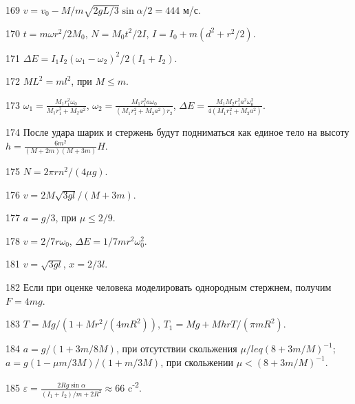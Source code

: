 \begin{Answer}{169}
$v = v_0 -M/m \sqrt{2gL/3} \sin \alpha /2 = 444$ м/с.
\end{Answer}
\begin{Answer}{170}
$t = m\omega r^2 / 2M_0$, $N = M_0t^2/2I$, $I = I_0 + m(d^2 + r^2/2)$.
\end{Answer}
\begin{Answer}{171}
$\Delta E = I_1 I_2 (\omega_1 - \omega_2)^2/ 2(I_1 + I_2)$.
\end{Answer}
\begin{Answer}{172}
$ML^2 = ml^2$, при $M \leq m$.
\end{Answer}
\begin{Answer}{173}
$\omega_1 = \frac{M_1r_1^2\omega_0}{M_1r_1^2 + M_2a^2}$, $\omega_2 = \frac{M_1r_1^2 a \omega_0}{(M_1r_1^2 + M_2a^2)r_2}$, $\Delta E = \frac{M_1 M_2r_1^2a^2\omega_0^2}{4(M_1r_1^2 + M_2a^2)}$.
\end{Answer}
\begin{Answer}{174}
После удара шарик и стержень будут подниматься как единое тело на высоту $h = \frac{6m^2}{(M+2m)(M+3m)}H$.
\end{Answer}
\begin{Answer}{175}
$N = 2\pi r n^2/(4 \mu g)$.
\end{Answer}
\begin{Answer}{176}
$v = 2M\sqrt{3gl}/(M+3m)$.
\end{Answer}
\begin{Answer}{177}
$a = g/3$, при $\mu \leq 2/9$.
\end{Answer}
\begin{Answer}{178}
$v = 2/7r \omega_0$, $\Delta E = 1/7 mr^2 \omega_0^2$.
\end{Answer}
\begin{Answer}{181}
$v = \sqrt{3gl}$, $x = 2/3l$.
\end{Answer}
\begin{Answer}{182}
Если при оценке человека моделировать однородным стержнем, получим $F = 4mg$.
\end{Answer}
\begin{Answer}{183}
$T = Mg/(1 + Mr^2/(4mR^2))$, $T_1 = Mg + MhrT/(\pi m R^2)$.
\end{Answer}
\begin{Answer}{184}
$a = g/(1+3m/8M)$, при отсутствии скольжения $\mu /leq (8+3m/M)^{-1}$; $a = g(1 - \mu m/3M)/(1+m/3M)$, при скольжении $\mu < (8+3m/M)^{-1}$.
\end{Answer}
\begin{Answer}{185}
$\varepsilon = \frac{2Rg \sin \alpha}{(I_1 + I_2)/m + 2R^2} \approx 66$ c\textsuperscript{-2}.
\end{Answer}
